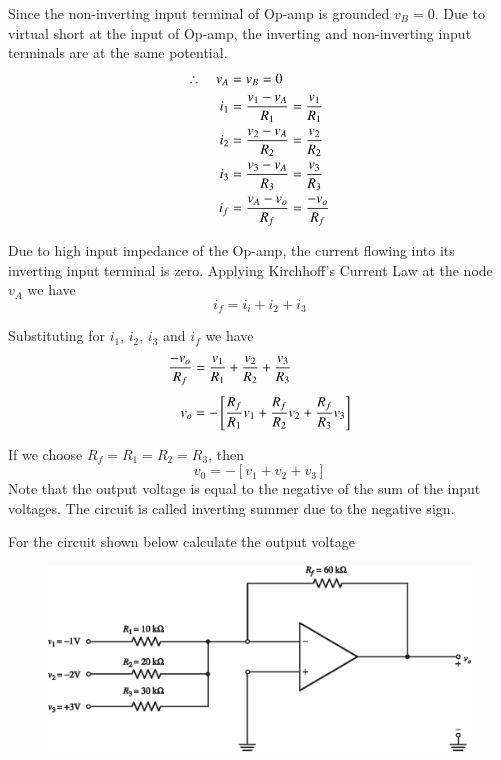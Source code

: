 Since the non-inverting input terminal of Op-amp is grounded $v_{B}=0$. Due to virtual short at the input of Op-amp, the inverting and non-inverting input terminals are at the same potential.
\begin{align}
\therefore\quad v_{A} &= v_{B}=0\notag\\
i_{1} &= \frac{v_{1}-v_{A}}{R_{1}}=\frac{v_{1}}{R_{1}}\label{eq5.36}\\
i_{2} &= \frac{v_{2}-v_{A}}{R_{2}}=\frac{v_{2}}{R_{2}}\label{eq5.37}\\
i_{3} &= \frac{v_{3}-v_{A}}{R_{3}}=\frac{v_{3}}{R_{3}}\label{eq5.38}\\
i_{f} &= \frac{v_{A}-v_{o}}{R_{f}}=\frac{-v_{o}}{R_{f}}\label{eq5.39}
\end{align}

Due to high input impedance of the Op-amp, the current flowing into its inverting input terminal is zero. Applying Kirchhoff's Current Law at the node $v_{A}$ we have
\begin{equation}
i_{f}=i_{i}+i_{2}+i_{3}\label{eq5.40}
\end{equation}

Substituting for $i_{1}$, $i_{2}$, $i_{3}$ and $i_{f}$ we have
\begin{align}
\frac{-v_{o}}{R_{f}} &= \frac{v_{1}}{R_{1}}+\frac{v_{2}}{R_{2}}+\frac{v_{3}}{R_{3}}\notag\\[4pt]
v_{o} &= -\left[\frac{R_{f}}{R_{1}}v_{1}+\frac{R_{f}}{R_{2}}v_{2}+\frac{R_{f}}{R_{3}}v_{3}\right]\label{eq5.40}
\end{align}

If we choose $R_{f}=R_{1}=R_{2}=R_{3}$, then
\begin{equation}
v_{0}=-[v_{1}+v_{2}+v_{3}]\label{eq5.42}
\end{equation}
Note that the output voltage is equal to the negative of the sum of the input voltages. The circuit is called inverting summer due to the negative sign.

\begin{example}\label{exam5.18}
For the circuit shown below calculate the output voltage
\begin{figure}[H]
\centering
\includegraphics{chap4/S3-EE-06-IN011.eps}
\end{figure}
\end{example}

